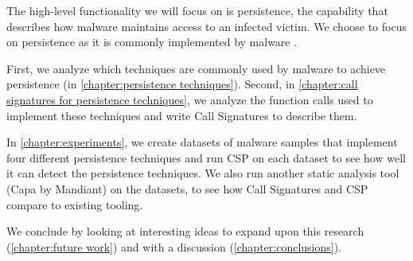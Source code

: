 The high-level functionality we will focus on is persistence, the capability that describes how malware maintains access to an infected victim. We choose to focus on persistence as it is commonly implemented by malware \cite{practical-malware-analysis}.

First, we analyze which techniques are commonly used by malware to achieve persistence (in \autoref{chapter:persistence techniques}). Second, in \autoref{chapter:call signatures for persistence techniques}, we analyze the function calls used to implement these techniques and write Call Signatures to describe them.

In \autoref{chapter:experiments}, we create datasets of malware samples that implement four different persistence techniques and run CSP on each dataset to see how well it can detect the persistence techniques. We also run another static analysis tool (Capa by Mandiant) on the datasets, to see how Call Signatures and CSP compare to existing tooling.

\medskip

We conclude by looking at interesting ideas to expand upon this research (\autoref{chapter:future work}) and with a discussion (\autoref{chapter:conclusions}).
